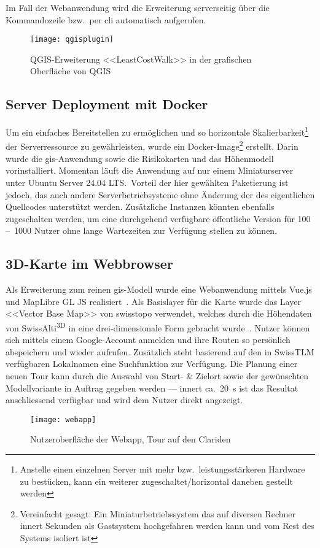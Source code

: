 Im Fall der Webanwendung wird die Erweiterung serverseitig über die Kommandozeile bzw.\ per \acrshort{cli} automatisch aufgerufen.

\begin{figure}[H]
  \centering
  \texttt{[image: qgisplugin]}
  \caption{QGIS-Erweiterung <<LeastCostWalk>> in der grafischen Oberfläche von QGIS}\label{fig:qgisplugin}
\end{figure}

\subsection{Server Deployment mit Docker}

Um ein einfaches Bereitstellen zu ermöglichen und so horizontale Skalierbarkeit\footnote{Anstelle einen einzelnen Server mit mehr bzw.\ leistungsstärkeren Hardware zu bestücken, kann ein weiterer zugeschaltet/horizontal daneben gestellt werden} der Serverressource zu gewährleisten, wurde ein Docker-Image\footnote{Vereinfacht gesagt: Ein Miniaturbetriebssystem das auf diversen Rechner innert Sekunden als Gastsystem hochgefahren werden kann und vom Rest des Systems isoliert ist} erstellt. Darin wurde die \gls{gis}-Anwendung sowie die Risikokarten und das Höhenmodell vorinstalliert. Momentan läuft die Anwendung auf nur einem Miniaturserver unter Ubuntu Server 24.04 LTS.\ Vorteil der hier gewählten Paketierung ist jedoch, das auch andere Serverbetriebsysteme ohne Änderung der des eigentlichen Quellcodes unterstützt werden. Zusätzliche Instanzen könnten ebenfalls zugeschalten werden, um eine durchgehend verfügbare öffentliche Version für 100 --~1000 Nutzer ohne lange Wartezeiten zur Verfügung stellen zu können.

\clearpage
\subsection{3D-Karte im Webbrowser}

Als Erweiterung zum reinen \gls{gis}-Modell wurde eine Webanwendung mittels Vue.js und MapLibre GL JS realisiert~\cite{vuedevman}\cite{maplibregljs}. Als Basislayer für die Karte wurde das Layer <<Vector Base Map>> von swisstopo verwendet, welches durch die Höhendaten von SwissAlti\textsuperscript{3D} in eine drei-dimensionale Form gebracht wurde~\cite{basevtprod}\cite{alti3dprod}. Nutzer können sich mittels einem Google-Account anmelden und ihre Routen so persönlich abspeichern und wieder aufrufen. Zusätzlich steht basierend auf den in SwissTLM verfügbaren Lokalnamen eine Suchfunktion zur Verfügung.
Die Planung einer neuen Tour kann durch die Auswahl von Start- \& Zielort sowie der gewünschten Modellvariante in Auftrag gegeben werden --- innert ca.\ \qty{20}{s} ist das Resultat anschliessend verfügbar und wird dem Nutzer direkt angezeigt.


  \begin{figure}[H]
    \centering
    \texttt{[image: webapp]}
    \caption{Nutzeroberfläche der Webapp, Tour auf den Clariden}\label{fig:mainui}
  \end{figure}



